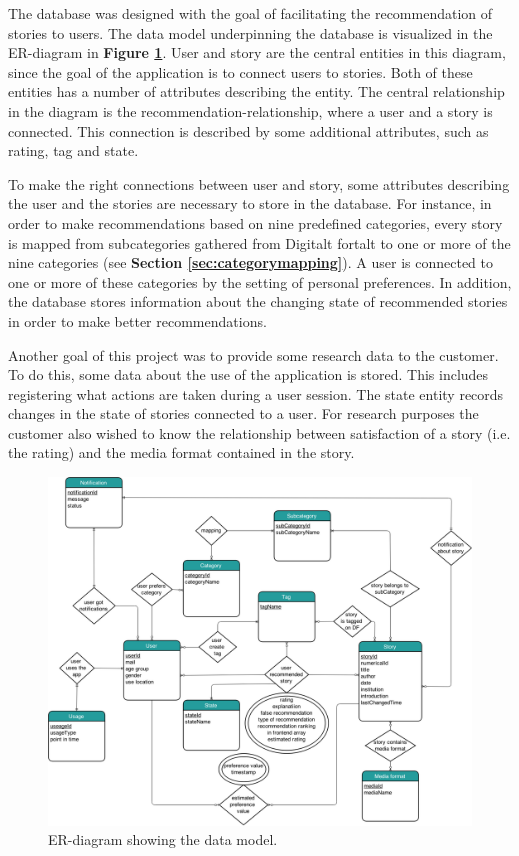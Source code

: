 The database was designed with the goal of facilitating the recommendation of stories to users. The data model underpinning the database is visualized in the ER-diagram in \textbf{Figure \ref{Fig:er_diagram}}. User and story are the central entities in this diagram, since the goal of the application is to connect users to stories. Both of these entities has a number of attributes describing the entity. The central relationship in the diagram is the recommendation-relationship, where a user and a story is connected. This connection is described by some additional attributes, such as rating, tag and state. \newline

To make the right connections between user and story, some attributes describing the user and the stories are necessary to store in the database. For instance, in order to make recommendations based on nine predefined categories, every story is mapped from subcategories gathered from Digitalt fortalt to one or more of the nine categories (see \textbf{Section \ref{sec:categorymapping}}). A user is connected to one or more of these categories by the setting of personal preferences. In addition, the database stores information about the changing state of recommended stories in order to make better recommendations. \newline

Another goal of this project was to provide some research data to the customer. To do this, some data about the use of the application is stored. This includes registering what actions are taken during a user session. The state entity records changes in the state of stories connected to a user. For research purposes the customer also wished to know the relationship between satisfaction of a story (i.e. the rating) and the media format contained in the story.

\begin{figure}[h!]
	\centering
	\includegraphics[width=\textwidth]{fig/er_diagram}
	\caption{ER-diagram showing the data model.}
	\label{Fig:er_diagram}
\end{figure}


